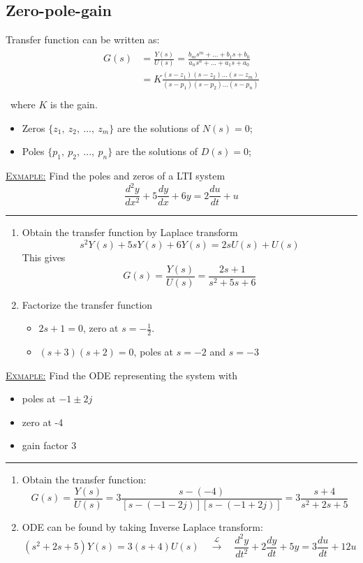 \documentclass[12pt,a4paper]{article}
\begin{document}
\subsection{Zero-pole-gain}
Transfer function can be written as:
\begin{align*}
\begin{split}
G(s)&=\frac{Y(s)}{U(s)}=\frac{b_{m} s^{m}+...+b_{1} s +b_{0}}{a_{n} s^{n}+...+a_{1} s+a_{0}}\\
&=\boxed{K\frac{(s-z_{1})(s-z_{2})...(s-z_{m})}{(s-p_{1})(s-p_{2})...(s-p_{n})}}\\
\end{split}
\end{align*}
 \ where $K$ is the gain.
 \begin{itemize}
  \item Zeros $\{z_{1} , \ z_{2}, \ ..., \ z_{m}\}$ are the solutions of $N(s)=0$;
  \item Poles $\{p_{1} , \ p_{2}, \ ..., \ p_{n}\}$ are the solutions of $D(s)=0$;
 \end{itemize}
 
\begin{tcolorbox}[breakable]
\underline{\textsc{Exmaple:}}
Find the poles and zeros of a LTI system
\[\frac{d^{2}y}{dx^{2}}+5\frac{dy}{dx}+6y = 2\frac{du}{dt}+u\]
\hrule
\vspace{.3cm}
\begin{enumerate}
\item Obtain the transfer function by Laplace transform
\[s^{2}Y(s)+5sY(s)+6Y(s) = 2sU(s)+U(s)\]
This gives
\[G(s) =\frac{Y(s)}{U(s)} = \frac{2s+1}{s^{2}+5s+6} \]
\item Factorize the transfer function
\begin{itemize}
\item $2s+1=0$, zero at $s = -\frac{1}{2}$.
\item $(s+3)(s+2)=0$, poles at $s = -2$ and $s = -3$
\end{itemize}
\end{enumerate}
\end{tcolorbox}

\begin{tcolorbox}[breakable]
\underline{\textsc{Exmaple:}}
Find the ODE representing the system with 
\begin{itemize}
\item poles at $-1\pm 2j$
\item zero at -4 
\item gain factor 3
\end{itemize}
\hrule
\vspace{.3cm}
\begin{enumerate}
\item Obtain the transfer function:
\[G(s) = \frac{Y(s)}{U(s)} = 3\frac{s-(-4)}{[s-(-1-2j)][s-(-1+2j)]} = 3\frac{s+4}{s^{2}+2s+5}\]
\item ODE can be found by taking Inverse Laplace transform:
\[(s^{2}+2s+5)Y(s) = 3(s+4)U(s)\quad  \xrightarrow{\mathcal{L}} \quad \frac{d^{2}y}{dt^{2}}+2\frac{dy}{dt}+5y = 3\frac{du}{dt}+12u \]
\end{enumerate}
\end{tcolorbox}
\end{document}
